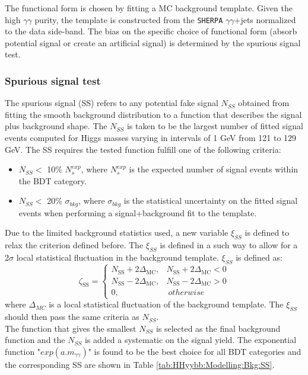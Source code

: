 The functional form is chosen by fitting a MC background template. Given the high $\gamma\gamma$ purity, the template is constructed from the \texttt{SHERPA} $\gamma\gamma$+jets normalized to the data side-band. The bias on the specific choice of functional form (absorb potential signal or create an artificial signal) is determined by the spurious signal test. 

\subsubsection{Spurious signal test}
\label{HHyybb:Modelling:Bkg:SS}
The spurious signal (SS) refers to any potential fake signal $N_{SS}$ obtained from fitting the smooth background distribution to a function that describes the signal plus background shape. The $N_{SS}$ is taken to be the largest number of fitted signal events computed for Higgs masses varying in intervals of 1 GeV from 121 to 129 GeV. The SS requires the tested function fulfill one of the following criteria: 
\begin{itemize}
    \item $N_{SS} < $ 10\% $N_{s}^{exp}$, where $N_{s}^{exp}$ is the expected number of signal events within the BDT category. 
    \item $N_{SS} < $ 20\% $\sigma_{bkg}$, where $\sigma_{bkg}$ is the statistical uncertainty on the fitted signal events when performing a signal+background fit to the template. 
\end{itemize}

Due to the limited background statistics used, a new variable $\xi_{SS}$ is defined to relax the criterion defined before. The $\xi_{SS}$ is defined in a such way to allow for a 2$\sigma$ local statistical fluctuation in the background template. $\xi_{SS}$ is defined as: 
\begin{equation}
    \zeta_{\mathrm{SS}}=\left\{\begin{array}{ll}
N_{\mathrm{SS}}+2 \Delta_{\mathrm{MC}}, & N_{\mathrm{SS}}+2 \Delta_{\mathrm{MC}}<0 \\
N_{\mathrm{SS}}-2 \Delta_{\mathrm{MC}}, & N_{\mathrm{SS}}-2 \Delta_{\mathrm{MC}}>0 \\
0, & \  otherwise 
\end{array}\right.
\end{equation}
where $\Delta_{MC}$ is a local statistical fluctuation of the background template. The $\xi_{SS}$ should then pass the same criteria as $N_{SS}$. \\
The function that gives the smallest $N_{SS}$ is selected as the final background function and the $N_{SS}$ is added a systematic on the signal yield. The exponential function "$exp(a.m_{\gamma\gamma})$" is found to be the best choice for all BDT categories and the corresponding SS are shown in Table \ref{tab:HHyybb:Modelling:Bkg:SS}.

